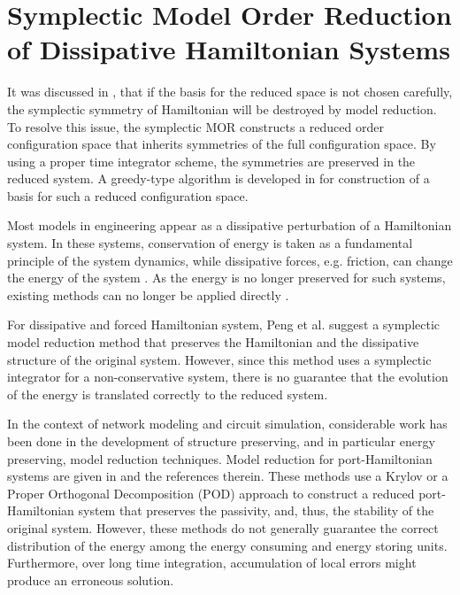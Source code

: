 \chapter{Symplectic Model Order Reduction of Dissipative Hamiltonian Systems} \label{chapter:6}

It was discussed in , that if the basis for the reduced space is not chosen carefully, the symplectic symmetry of Hamiltonian will be destroyed by model reduction. To resolve this issue, the symplectic MOR constructs a reduced order configuration space that inherits symmetries of the full configuration space. By using a proper time integrator scheme, the symmetries are preserved in the reduced system. A greedy-type algorithm is developed in  for construction of a basis for such a reduced configuration space.

Most models in engineering appear as a dissipative perturbation of a Hamiltonian system. In these systems, conservation of energy is taken as a fundamental principle of the system dynamics, while dissipative forces, e.g. friction, can change the energy of the system \cite{vanderSchaft:2014:PST:2693645.2693646}. As the energy is no longer preserved for such systems, existing methods can no longer be applied directly \cite{doi:10.1137/140978922}.

For dissipative and forced Hamiltonian system, Peng et al. \cite{peng2016geometric} suggest a symplectic model reduction method that preserves the Hamiltonian and the dissipative structure of the original system. However, since this method uses a symplectic integrator for a non-conservative system, there is no guarantee that the evolution of the energy is translated correctly to the reduced system.

In the context of network modeling and circuit simulation, considerable work has been done in the development of structure preserving, and in particular energy preserving, model reduction techniques. Model reduction for port-Hamiltonian systems are given in \cite{polyuga2010structure,beattie2011structure,doi:10.1137/15M1055085} and the references therein. These methods use a Krylov or a Proper Orthogonal Decomposition (POD) approach to construct a reduced port-Hamiltonian system that preserves the passivity, and, thus, the stability of the original system. However, these methods do not generally guarantee the correct distribution of the energy among the energy consuming and energy storing units. Furthermore, over long time integration, accumulation of local errors might produce an erroneous solution.

